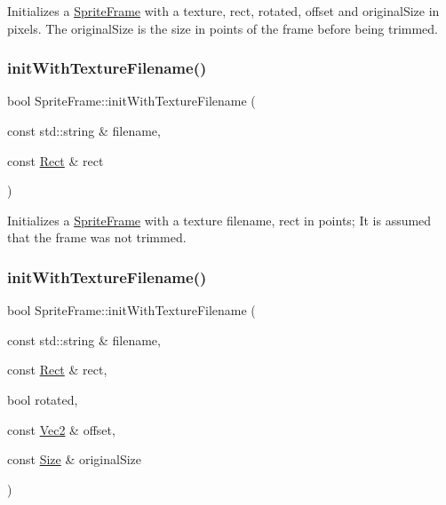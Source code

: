 Initializes a \hyperlink{classSpriteFrame}{Sprite\+Frame} with a texture, rect, rotated, offset and original\+Size in pixels. The original\+Size is the size in points of the frame before being trimmed. \mbox{\label{classSpriteFrame_a148345ef7f3bb972f829c8345d8eafe6}} 
\subsubsection{\texorpdfstring{init\+With\+Texture\+Filename()}{initWithTextureFilename()}\hspace{0.1cm}{\footnotesize\ttfamily [1/4]}}
{\footnotesize\ttfamily bool Sprite\+Frame\+::init\+With\+Texture\+Filename (\begin{DoxyParamCaption}\item[{const std\+::string \&}]{filename,  }\item[{const \hyperlink{classRect}{Rect} \&}]{rect }\end{DoxyParamCaption})}

Initializes a \hyperlink{classSpriteFrame}{Sprite\+Frame} with a texture filename, rect in points; It is assumed that the frame was not trimmed. \mbox{\label{classSpriteFrame_ad1b6afd243eadab8a2f2128561645133}} 
\subsubsection{\texorpdfstring{init\+With\+Texture\+Filename()}{initWithTextureFilename()}\hspace{0.1cm}{\footnotesize\ttfamily [2/4]}}
{\footnotesize\ttfamily bool Sprite\+Frame\+::init\+With\+Texture\+Filename (\begin{DoxyParamCaption}\item[{const std\+::string \&}]{filename,  }\item[{const \hyperlink{classRect}{Rect} \&}]{rect,  }\item[{bool}]{rotated,  }\item[{const \hyperlink{classVec2}{Vec2} \&}]{offset,  }\item[{const \hyperlink{classSize}{Size} \&}]{original\+Size }\end{DoxyParamCaption})}

